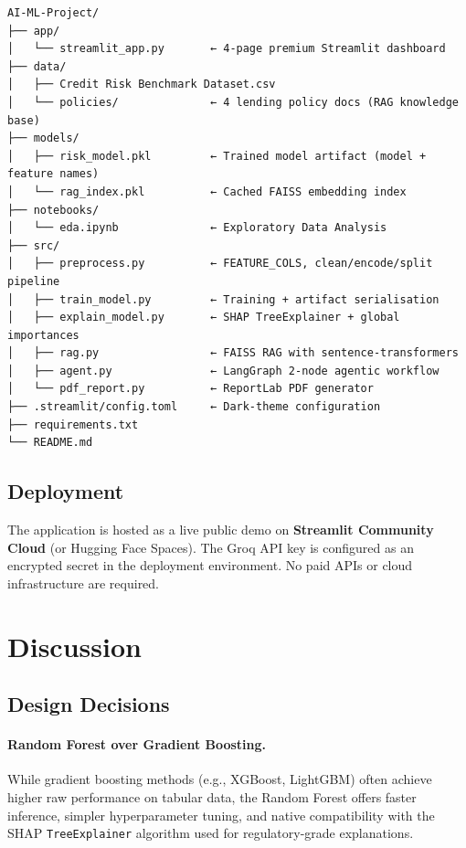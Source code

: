 \documentclass[11pt,a4paper]{article}
\begin{document}
\begin{verbatim}
AI-ML-Project/
├── app/
│   └── streamlit_app.py       ← 4-page premium Streamlit dashboard
├── data/
│   ├── Credit Risk Benchmark Dataset.csv
│   └── policies/              ← 4 lending policy docs (RAG knowledge base)
├── models/
│   ├── risk_model.pkl         ← Trained model artifact (model + feature names)
│   └── rag_index.pkl          ← Cached FAISS embedding index
├── notebooks/
│   └── eda.ipynb              ← Exploratory Data Analysis
├── src/
│   ├── preprocess.py          ← FEATURE_COLS, clean/encode/split pipeline
│   ├── train_model.py         ← Training + artifact serialisation
│   ├── explain_model.py       ← SHAP TreeExplainer + global importances
│   ├── rag.py                 ← FAISS RAG with sentence-transformers
│   ├── agent.py               ← LangGraph 2-node agentic workflow
│   └── pdf_report.py          ← ReportLab PDF generator
├── .streamlit/config.toml     ← Dark-theme configuration
├── requirements.txt
└── README.md
\end{verbatim}

\subsection{Deployment}

The application is hosted as a live public demo on \textbf{Streamlit Community Cloud}
(or Hugging Face Spaces). The Groq API key is configured as an encrypted secret in the
deployment environment. No paid APIs or cloud infrastructure are required.

\section{Discussion}
\label{sec:discussion}

\subsection{Design Decisions}

\paragraph{Random Forest over Gradient Boosting.}
While gradient boosting methods (e.g., XGBoost, LightGBM) often achieve higher raw
performance on tabular data, the Random Forest offers faster inference, simpler
hyperparameter tuning, and native compatibility with the SHAP \texttt{TreeExplainer}
algorithm used for regulatory-grade explanations.
\end{document}
